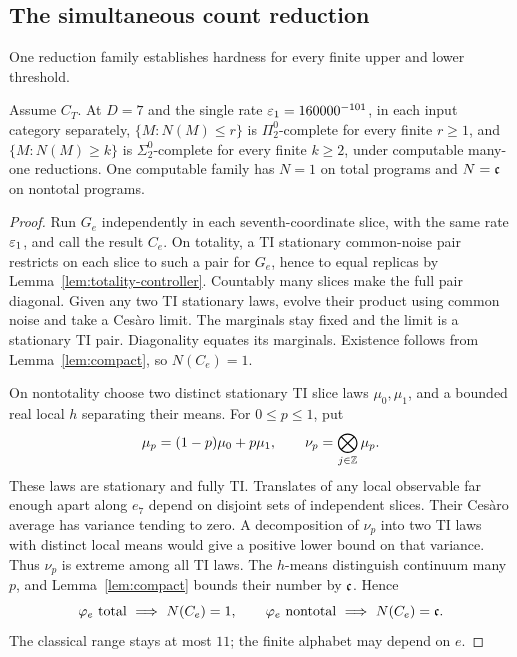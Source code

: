 \subsection{The simultaneous count reduction}
One reduction family establishes hardness for every finite upper
and lower threshold.
\begin{maintheorem}\label{thm:completeness}
Assume \(C_T\). At \(D=7\) and the single rate
\(\varepsilon_1=160000^{-101}\), in each input category separately,
\(\{M:N(M)\le r\}\) is \(\Pi^0_2\)-complete for every finite
\(r\ge1\), and \(\{M:N(M)\ge k\}\) is \(\Sigma^0_2\)-complete
for every finite \(k\ge2\), under computable many-one reductions.
One computable family has \(N=1\) on total programs and
\(N=\mathfrak c\) on nontotal programs.
\end{maintheorem}
\begin{proof}
Run \(G_e\) independently in each seventh-coordinate slice,
with the same rate \(\varepsilon_1\), and call the result \(C_e\).
On totality, a TI stationary common-noise pair restricts on each
slice to such a pair for \(G_e\), hence to equal replicas by
Lemma~\ref{lem:totality-controller}. Countably many slices make
the full pair diagonal. Given any two TI stationary laws, evolve
their product using common noise and take a Ces\`aro limit.
The marginals stay fixed and the limit is a stationary TI pair.
Diagonality equates its marginals. Existence follows from
Lemma~\ref{lem:compact}, so \(N(C_e)=1\).

On nontotality choose two distinct stationary TI slice laws
\(\mu_0,\mu_1\), and a bounded real local \(h\) separating
their means. For \(0\le p\le1\), put
\[
 \mu_p=(1-p)\mu_0+p\mu_1,\qquad
 \nu_p=\bigotimes_{j\in\mathbb Z}\mu_p.
\]
These laws are stationary and fully TI. Translates of any local
observable far enough apart along \(e_7\) depend on disjoint
sets of independent slices. Their Ces\`aro average has variance
tending to zero. A decomposition of \(\nu_p\) into two TI laws
with distinct local means would give a positive lower bound on
that variance. Thus \(\nu_p\) is extreme among all TI laws.
The \(h\)-means distinguish continuum many \(p\), and
Lemma~\ref{lem:compact} bounds their number by \(\mathfrak c\).
Hence
\begin{equation}\label{eq:one-continuum}
 \varphi_e\text{ total}\ \Longrightarrow\ N(C_e)=1,\qquad
 \varphi_e\text{ nontotal}\ \Longrightarrow\ N(C_e)=\mathfrak c.
\end{equation}
The classical range stays at most \(11\); the finite alphabet
may depend on \(e\).


\end{proof}
